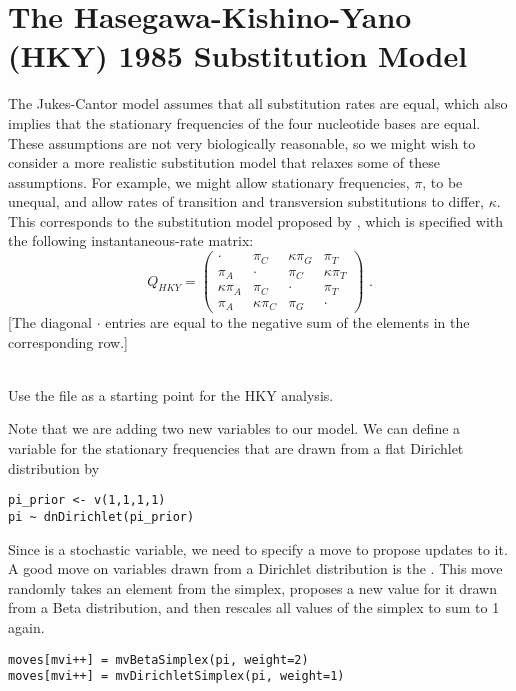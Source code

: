 \newpage
\section{The Hasegawa-Kishino-Yano (HKY) 1985 Substitution Model}

The Jukes-Cantor model assumes that all substitution rates are equal, which also implies that the stationary frequencies of the four nucleotide bases are equal.
These assumptions are not very biologically reasonable, so we might wish to consider a more realistic substitution model that relaxes some of these assumptions.
For example, we might allow stationary frequencies, $\pi$, to be unequal, and allow rates of transition and transversion substitutions to differ, $\kappa$.
This corresponds to the substitution model proposed by \citet[][HKY]{Hasegawa1985}, which is specified with the following instantaneous-rate matrix: 
\begin{equation*}
Q_{HKY} = \begin{pmatrix} 
{\cdot} 			& {\pi_C} 	& {\kappa\pi_G} 			& {\pi_T} \\ 
{\pi_A} 		& {\cdot} 			& {\pi_C} 			& {\kappa\pi_T} \\ 
{\kappa\pi_A} 			& {\pi_C} 			& {\cdot} 			& {\pi_T} \\ 
{\pi_A} 			& {\kappa\pi_C} 			& {\pi_G} 	& {\cdot}  
\end{pmatrix} \mbox{  .}
\end{equation*}
[The diagonal ${\cdot}$ entries are equal to the negative sum of the elements in the corresponding row.] 

\noindent \\ \impmark Use the file  as a starting point for the HKY analysis.

Note that we are adding two new variables to our model.
We can define a variable  for the stationary frequencies that are drawn from a flat Dirichlet distribution by
{\tt \begin{snugshade*}
\begin{lstlisting}
pi_prior <- v(1,1,1,1) 
pi ~ dnDirichlet(pi_prior)
\end{lstlisting}
\end{snugshade*}}
Since  is a stochastic variable, we need to specify a move to propose updates to it.
A good move on variables drawn from a Dirichlet distribution is the .
This move randomly takes an element from the simplex, proposes a new value for it drawn from a Beta distribution, and then rescales all values of the simplex to sum to 1 again.
{\tt \begin{snugshade*}
\begin{lstlisting}
moves[mvi++] = mvBetaSimplex(pi, weight=2)
moves[mvi++] = mvDirichletSimplex(pi, weight=1)
\end{lstlisting}
\end{snugshade*}}


